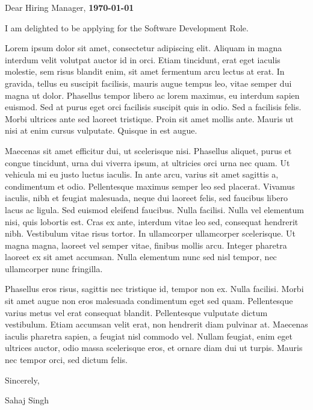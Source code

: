 \documentclass[letterpaper,11pt]{article}
\newcommand{\roleName}{Software Development Role}
\begin{document}
    \vspace*{10pt}
    \par Dear Hiring Manager,  \hfill \textbf{\today}
    \vspace*{10pt}
    \par I am delighted to be applying for the \roleName{}.
    \vspace*{10pt}
    \par Lorem ipsum dolor sit amet, consectetur adipiscing elit. Aliquam in magna interdum velit volutpat auctor id in orci. Etiam tincidunt, erat eget iaculis molestie, sem risus blandit enim, sit amet fermentum arcu lectus at erat. In gravida, tellus eu suscipit facilisis, mauris augue tempus leo, vitae semper dui magna ut dolor. Phasellus tempor libero ac lorem maximus, eu interdum sapien euismod. Sed at purus eget orci facilisis suscipit quis in odio. Sed a facilisis felis. Morbi ultrices ante sed laoreet tristique. Proin sit amet mollis ante. Mauris ut nisi at enim cursus vulputate. Quisque in est augue.
    \vspace*{10pt}
    \par Maecenas sit amet efficitur dui, ut scelerisque nisi. Phasellus aliquet, purus et congue tincidunt, urna dui viverra ipsum, at ultricies orci urna nec quam. Ut vehicula mi eu justo luctus iaculis. In ante arcu, varius sit amet sagittis a, condimentum et odio. Pellentesque maximus semper leo sed placerat. Vivamus iaculis, nibh et feugiat malesuada, neque dui laoreet felis, sed faucibus libero lacus ac ligula. Sed euismod eleifend faucibus. Nulla facilisi. Nulla vel elementum nisi, quis lobortis est. Cras ex ante, interdum vitae leo sed, consequat hendrerit nibh. Vestibulum vitae risus tortor. In ullamcorper ullamcorper scelerisque. Ut magna magna, laoreet vel semper vitae, finibus mollis arcu. Integer pharetra laoreet ex sit amet accumsan. Nulla elementum nunc sed nisl tempor, nec ullamcorper nunc fringilla.
    \vspace*{10pt}
    \par Phasellus eros risus, sagittis nec tristique id, tempor non ex. Nulla facilisi. Morbi sit amet augue non eros malesuada condimentum eget sed quam. Pellentesque varius metus vel erat consequat blandit. Pellentesque vulputate dictum vestibulum. Etiam accumsan velit erat, non hendrerit diam pulvinar at. Maecenas iaculis pharetra sapien, a feugiat nisl commodo vel. Nullam feugiat, enim eget ultrices auctor, odio massa scelerisque eros, et ornare diam dui ut turpis. Mauris nec tempor orci, sed dictum felis.
    \vspace*{10pt}
    \par Sincerely,
    \par Sahaj Singh
\end{document}

